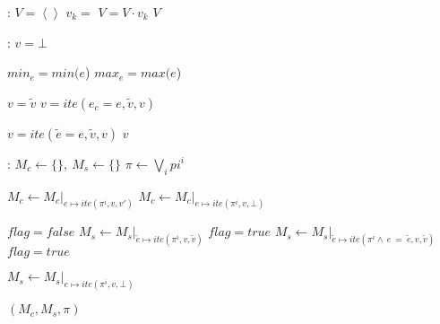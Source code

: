 \documentclass{article}
\begin{document}
\begin{algorithm}
  \begin{algorithmic}[1]
	:
		\State $V = \left\langle \right\rangle$ 
			\State $v_k = $ 
			\State $V = V \cdot v_k$
		\EndFor
		\State \Return $V$
	\EndFunction
  \end{algorithmic}

  \bigskip

  \begin{algorithmic}[1]
	:
		\State $v = \bot$ 

		\State $min_e = min(e$)
		\State $max_e = max(e$)

				\State ${v} = \widetilde{v}$
			\EndIf
		\Else
					\State $v = ite(e_c = e, \widetilde{v}, v)$
				\EndIf
			\EndFor
		\EndIf

				\State $v = ite(\widetilde{e} = e, \widetilde{v}, v)$
			\EndIf
		\EndFor
		\State \Return $v$
	\EndFunction
  \end{algorithmic}
  
\end{algorithm}

\begin{algorithm}
  \begin{algorithmic}[1]
	:
		\State $M_c \leftarrow \{\},~M_s \leftarrow \{\}$
		\State $\pi \leftarrow \bigvee\limits_{i} pi^i $
		\State

					\State $M_c \leftarrow {M_c}\vert_{e \mapsto ite(\pi^i, v, v')}$
				\Else
					\State $M_c \leftarrow {M_c}\vert_{e \mapsto ite(\pi^i, v, \bot)}$
				\EndIf
			\EndFor
		
			\State

				\State $flag = false$
						\State ${M_s} \leftarrow {M_s}\vert_{\widetilde{e} \mapsto ite(\pi^i, v, \widetilde{v})}$
			    		\State $flag = true$
			    	\Else
			    		\State ${M_s} \leftarrow {M_s}\vert_{\widetilde{e} \mapsto ite(\pi^i \wedge~e~=~\widetilde{e}, v, \widetilde{v})}$
			    		\State $flag = true$
			    	\EndIf
			    \EndFor

			    	\State $M_s \leftarrow {M_s}\vert_{e \mapsto ite(\pi^i, v, \bot)}$
			    \EndIf
			\EndFor

		\EndFor

		\State
		\State \Return $(M_c, M_s, \pi)$
	\EndFunction
  \end{algorithmic}
\end{algorithm}
\end{document}
